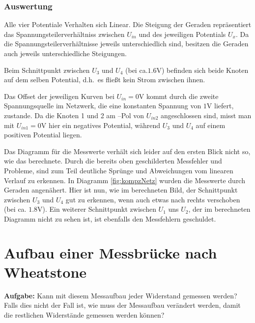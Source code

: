 \documentclass[10pt]{report}
\begin{document}
        \subsubsection{Auswertung}
        Alle vier Potentiale Verhalten sich Linear. Die Steigung der Geraden
        repräsentiert das Spannungsteilerverhältniss zwischen $U_{in}$ und des
        jeweiligen Potentials $U_x$. Da die Spannungsteilerverhältnisse jeweils
		unterschiedlich sind, besitzen die Geraden auch jeweils unterschiedliche
		Steigungen.

        Beim Schnittpunkt zwischen $U_3$ und $U_4$ (bei ca.$1.6$V) befinden sich
        beide Knoten auf dem selben Potential, d.h.\ es fließt kein Strom zwischen
        ihnen.

        Das Offset der jeweiligen Kurven bei $U_{in} = 0$V kommt durch die zweite
        Spannungsquelle im Netzwerk, die eine konstanten Spannung von $1$V liefert,
        zustande. Da die Knoten 1 und 2 am –Pol von $U_{in2}$ angeschlossen sind, misst
		man mit $U_{in1} = 0$V hier ein negatives Potential, während $U_3$ und $U_4$ auf
		einem positiven Potential liegen.

        \vspace{0.5cm}
        Das Diagramm für die Messwerte verhält sich leider auf den ersten Blick nicht so,
		wie das berechnete. Durch die bereits oben geschilderten Messfehler und Probleme,
		sind zum Teil deutliche Sprünge und Abweichungen vom linearen Verlauf zu erkennen.
		In Diagramm \ref{fig:kompzNetz} wurden die Messwerte durch Geraden angenähert. Hier ist nun, wie
		im berechneten Bild, der Schnittpunkt zwischen $U_3$ und $U_4$ gut zu erkennen, wenn auch
		etwas nach rechts verschoben (bei ca. $1.8$V). Ein weiterer  Schnittpunkt zwischen $U_1$
		uns $U_2$, der im berechneten Diagramm nicht zu sehen ist, ist ebenfalls den Messfehlern
		geschuldet.


        \section{Aufbau einer Messbrücke nach Wheatstone}
        \textbf{Aufgabe:} Kann mit diesem Messaufbau jeder Widerstand gemessen werden? Falls dies nicht der
        Fall ist, wie muss der Messaufbau verändert werden, damit die restlichen Widerstände
        gemessen werden können?
\end{document}
